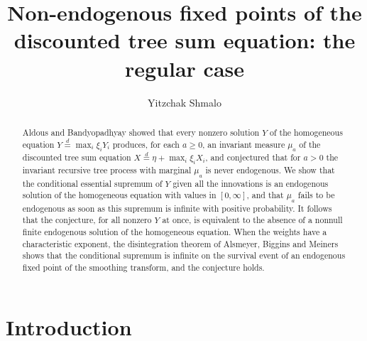 \documentclass[11pt]{amsart}
\title[Non-endogeny for discounted tree sums]{Non-endogenous fixed points of the discounted tree sum equation: the regular case}
\author{Yitzchak Shmalo}
\date{}
\theoremstyle{remark}
\begin{document}
\begin{abstract}
Aldous and Bandyopadhyay showed that every nonzero solution $Y$ of the homogeneous
equation $Y\stackrel{d}{=}\max_i \xi_i Y_i$ produces, for each $a\ge 0$, an invariant
measure $\mu_a$ of the discounted tree sum equation
$X\stackrel{d}{=}\eta+\max_i \xi_i X_i$, and conjectured that for $a>0$ the invariant
recursive tree process with marginal $\mu_a$ is never endogenous. We show that the
conditional essential supremum of $Y$ given all the innovations is an endogenous solution
of the homogeneous equation with values in $[0,\infty]$, and that $\mu_a$ fails to be
endogenous as soon as this supremum is infinite with positive probability. It follows
that the conjecture, for all nonzero $Y$ at once, is equivalent to the absence of a
nonnull finite endogenous solution of the homogeneous equation. When the weights have a
characteristic exponent, the disintegration theorem of Alsmeyer, Biggins and Meiners
shows that the conditional supremum is infinite on the survival event of an endogenous
fixed point of the smoothing transform, and the conjecture holds.
\end{abstract}

\maketitle

\section{Introduction}
\end{document}
